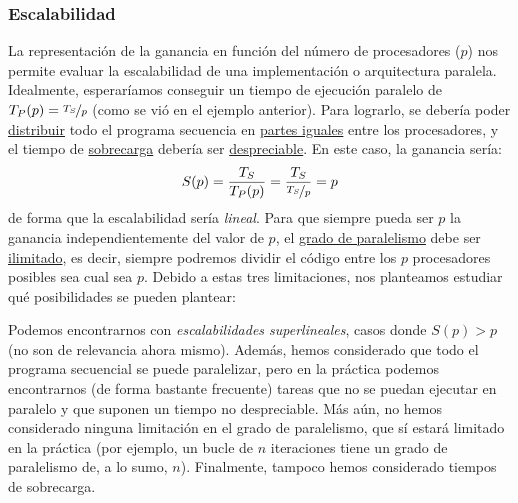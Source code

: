 \subsubsection{Escalabilidad}
La representación de la ganancia en función del número de procesadores ($p$) nos permite evaluar la escalabilidad de una implementación o arquitectura paralela. Idealmente, esperaríamos conseguir un tiempo de ejecución paralelo de ${T_P(p) = \nicefrac{T_S}{p}}$ (como se vió en el ejemplo anterior). Para lograrlo, se debería poder \underline{distribuir} todo el programa secuencia en \underline{partes iguales} entre los procesadores, y el tiempo de \underline{sobrecarga} debería ser \underline{despreciable}. En este caso, la ganancia sería:
\begin{equation*}
    S(p) = \dfrac{T_S}{T_P(p)} = \dfrac{T_S}{\nicefrac{T_S}{p}} = p
\end{equation*}
de forma que la escalabilidad sería \emph{lineal}. Para que siempre pueda ser $p$ la ganancia independientemente del valor de $p$, el \underline{grado de paralelismo} debe ser \underline{ilimitado}, es decir, siempre podremos dividir el código entre los $p$ procesadores posibles sea cual sea $p$. Debido a estas tres limitaciones, nos planteamos estudiar qué posibilidades se pueden plantear:

Podemos encontrarnos con \emph{escalabilidades superlineales}, casos donde $S(p)>p$ (no son de relevancia ahora mismo). Además, hemos considerado que todo el programa secuencial se puede paralelizar, pero en la práctica podemos encontrarnos (de forma bastante frecuente) tareas que no se puedan ejecutar en paralelo y que suponen un tiempo no despreciable. Más aún, no hemos considerado ninguna limitación en el grado de paralelismo, que sí estará limitado en la práctica (por ejemplo, un bucle de $n$ iteraciones tiene un grado de paralelismo de, a lo sumo, $n$). Finalmente, tampoco hemos considerado tiempos de sobrecarga.

